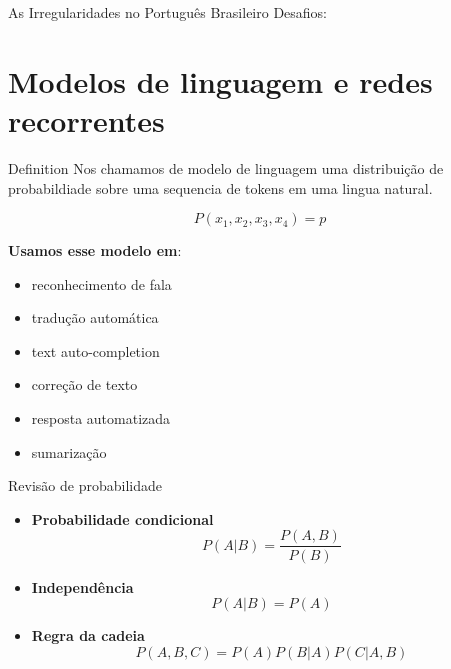 \documentclass[10pt]{beamer}
\begin{document}
\begin{frame}[fragile]{As Irregularidades no Português Brasileiro}
Desafios:
\begin{itemize}
\vspace{0.2cm}
\vspace{0.2cm}
\end{itemize}
\end{frame}

\section{Modelos de linguagem e redes recorrentes}


\begin{frame}{Definition}
Nos chamamos de \alert{modelo de linguagem} uma distribuição de probabildiade sobre uma sequencia de tokens em uma lingua natural.

\[
P(x_1,x_2,x_3,x_4) = p
\]

\textbf{Usamos esse modelo em}:
\begin{itemize}
\item reconhecimento de fala
\item tradução automática
\item text auto-completion
\item correção de texto
\item resposta automatizada
\item sumarização
\end{itemize}


\end{frame}

\begin{frame}{Revisão de probabilidade}
\large{
\begin{itemize}
\item \textbf{Probabilidade condicional} 
\[
P(A|B) = \frac{P(A,B)}{P(B)}
\]
\item \textbf{Independência} 
\[
P(A|B) = P(A)
\]
\item \textbf{Regra da cadeia} 
\[
P(A,B,C) = P(A)P(B|A)P(C|A,B)
\]
\end{itemize}
}
\end{frame}
\end{document}
